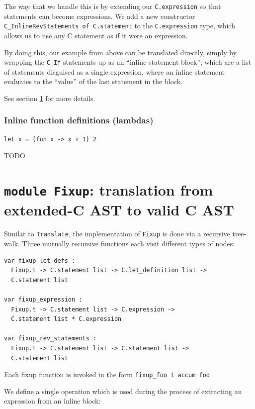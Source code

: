 \documentclass[12pt,a4paper,twoside,openright]{report}
\begin{document}
The way that we handle this is by extending our \lstinline!C.expression! so
that statements can become expressions.  We add a new constructor
\lstinline!C_InlineRevStatements of C.statement! to the
\lstinline!C.expression! type, which allows us to use any C statement as if it
were an expression.

By doing this, our example from above can be translated directly, simply by
wrapping the \lstinline!C_If! statements up as an ``inline statement block'',
which are a list of statements disguised as a single expression, where an
inline statement evaluates to the ``value'' of the last statement in the block.

See section \ref{module-fixup} for more details.


\subsubsection{Inline function definitions (lambdas)}\label{c-inline-functions}

\begin{lstlisting}
let x = (fun x -> x + 1) 2
\end{lstlisting}

TODO

\section{\texttt{module Fixup}: translation from extended-C AST to valid C AST}\label{module-fixup}

Similar to \lstinline!Translate!, the implementation of \lstinline!Fixup! is
done via a recursive tree-walk. Three mutually recursive functions each visit
different types of nodes:

\begin{lstlisting}
var fixup_let_defs :
  Fixup.t -> C.statement list -> C.let_definition list ->
  C.statement list

var fixup_expression :
  Fixup.t -> C.statement list -> C.expression ->
  C.statement list * C.expression

var fixup_rev_statements :
  Fixup.t -> C.statement list -> C.statement list ->
  C.statement list
\end{lstlisting}

Each fixup function is invoked in the form \lstinline!fixup_foo t accum foo!

We define a single operation which is used during the process of extracting an
expression from an inline block:
\end{document}

